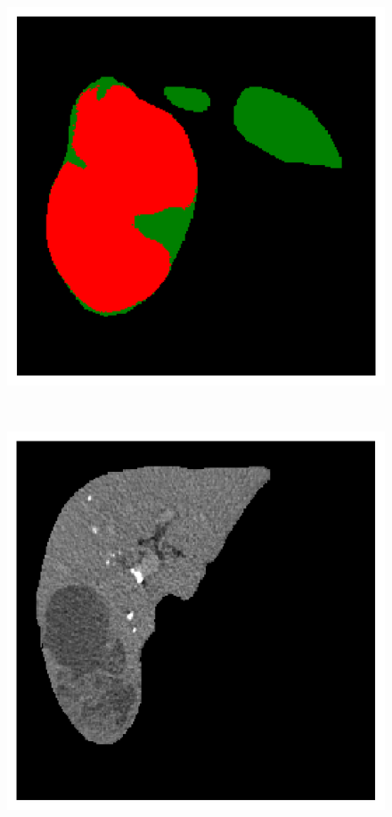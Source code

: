 \begin{figure}[!ht]
\begin{minipage}{4cm}
	\end{minipage} \hspace{-0.3cm}
	\begin{minipage}{4cm}
		\includegraphics[width=\linewidth]{images/ResizeTumorMult_Pred_Pat5_0}
	\end{minipage} \\
	\begin{minipage}{4cm}
		\includegraphics[width=\linewidth]{images/ResizeTumorMult_Raw_Pat0_4}

\end{minipage}
\end{figure}
